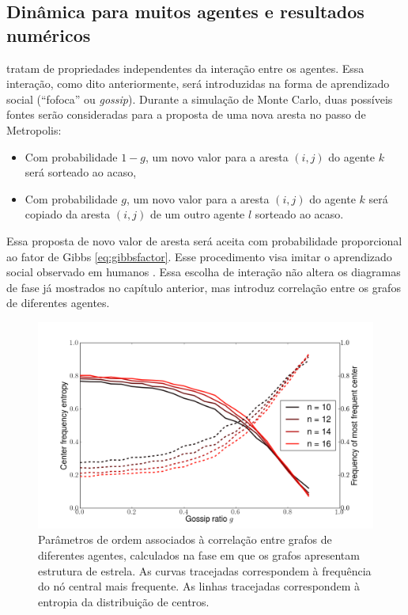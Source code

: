 \subsection{Dinâmica para muitos agentes e resultados numéricos} 
 tratam de propriedades independentes da interação entre os agentes. Essa interação, como dito anteriormente, será introduzidas na forma de aprendizado social (``fofoca'' ou \textit{gossip}). Durante a simulação de Monte Carlo, duas possíveis fontes serão consideradas para a proposta de uma nova aresta no passo de Metropolis:
\begin{itemize}
 \item Com probabilidade $1-g$, um novo valor para a aresta $(i,j)$ do agente $k$ será sorteado ao acaso, 
 \item Com probabilidade $g$, um novo valor para a aresta $(i,j)$ do agente $k$ será copiado da aresta $(i,j)$ de um outro agente $l$ sorteado ao acaso.
\end{itemize}
Essa proposta de novo valor de aresta será aceita com probabilidade proporcional ao fator de Gibbs \eqref{eq:gibbsfactor}. Esse procedimento visa imitar o aprendizado social observado em humanos \cite[-2em]{Dunbar2010book}. Essa escolha de interação não altera os diagramas de fase já mostrados no capítulo anterior, mas introduz correlação entre os grafos de diferentes agentes. 
\begin{figure}
	\centering
	\includegraphics[width = 1\textwidth]{figuras/gossip.png}
 	\caption[Parâmetros de ordem associados à correlação entre grafos de diferentes agentes]{ Parâmetros de ordem associados à correlação entre grafos de diferentes agentes, calculados na fase em que os grafos apresentam estrutura de estrela. As curvas tracejadas correspondem à frequência do nó central mais frequente. As linhas tracejadas correspondem à entropia da distribuição de centros.}
 	\label{fig:gossip}
\end{figure}

